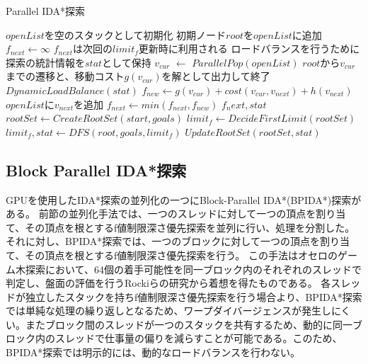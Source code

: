 \documentclass[a4paper,11pt,oneside,openany]{jsbook}
\begin{document}
\newpage
\begin{algorithm}[H]
\caption{Parallel IDA*探索}
\label{alg:pbnf}
\begin{algorithmic}[1]
    \State $openList$を空のスタックとして初期化
    \State 初期ノード$root$を$openList$に追加
    \State $f_{next} \leftarrow \infty$
    \State $f_{next}$は次回の$limit_f$更新時に利用される
    \State ロードバランスを行うために探索の統計情報を$stat$として保持
        \State $v_{cur}$ $\leftarrow$ ${ParallelPop}(openList)$
            \State $root$から$v_{cur}$までの遷移と、移動コスト$g(v_{cur})$を解として出力して終了
        \EndIf
            \State $DynamicLoadBalance(stat)$
        \EndIf
            \State $f_{new} \leftarrow g(v_{cur}) + cost(v_{cur}, v_{next}) + h(v_{next})$
                \State $openList$に$v_{next}$を追加
            \Else
                \State $f_{next} \leftarrow min(f_{next}, f_{new})$
            \EndIf
        \EndFor
    \EndWhile
    \State \Return $f_next, stat$
\EndFunction
{}
    \State $rootSet \gets {CreateRootSet}(start, goals)$
    \State $limit_f \leftarrow {DecideFirstLimit}(rootSet)$
            \State $limit_f, stat \gets {DFS}(root, goals, limit_f)$
        \EndParallelForByThreads
        \State $UpdateRootSet(rootSet, stat)$
    \EndWhile
\EndFunction

\end{algorithmic}
\end{algorithm}
\newpage


\subsection{Block Parallel IDA*探索}
GPUを使用したIDA*探索の並列化の一つにBlock-Parallel IDA*(BPIDA*)探索\cite{HA17}がある。
前節の並列化手法では、一つのスレッドに対して一つの頂点を割り当て、その頂点を根とするf値制限深さ優先探索を並列に行い、処理を分割した。それに対し、BPIDA*探索では、一つのブロックに対して一つの頂点を割り当て、その頂点を根とするf値制限深さ優先探索を行う。
この手法はオセロのゲーム木探索において、64個の着手可能性を同一ブロック内のそれぞれのスレッドで判定し、盤面の評価を行うRockiらの研究\cite{RS09}から着想を得たものである。
各スレッドが独立したスタックを持ちf値制限深さ優先探索を行う場合より、BPIDA*探索では単純な処理の繰り返しとなるため、ワープダイバージェンスが発生しにくい。またブロック間のスレッドが一つのスタックを共有するため、動的に同一ブロック内のスレッドで仕事量の偏りを減らすことが可能である。このため、BPIDA*探索では明示的には、動的なロードバランスを行わない。
\end{document}
